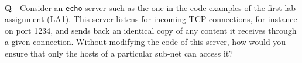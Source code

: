 \documentclass{llncs}
\newcounter{ques}
\renewcommand{\question}[1]{\paragraph{}\textbf{Q\theques} - #1\stepcounter{ques} }
\newcommand{\answer}[1]{}%
\begin{document}
\newpage

\question{Consider an \texttt{echo} server such as the one in the code
  examples of the first lab assignment (LA1). This server listens for
  incoming TCP connections, for instance on port 1234, and sends back
  an identical copy of any content it receives through a given
  connection. \underline{Without modifying the code of this server},
  how would you ensure that only the hosts of a particular sub-net can
  access it?}

\answer{Use a firewall to filter incoming packets from any host except
  the ones on the sub-net.}
\end{document}
